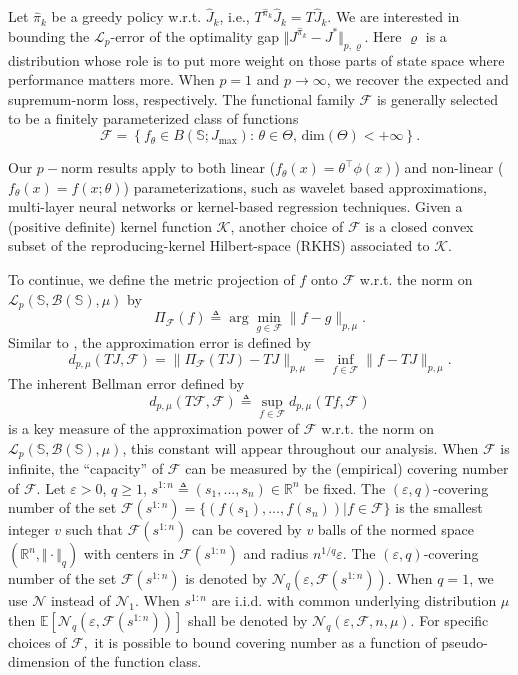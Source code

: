 \documentclass[12pt,technote,onecolumn]{IEEEtran}
\begin{document}
Let $\widehat{\pi}_{k}$ be a greedy policy w.r.t. $\widehat{J}_{k}$,
i.e., $T^{\widehat{\pi}_{k}}\widehat{J}_{k}=T\widehat{J}_{k}$.
We are interested in bounding the $\mathcal{L}_{p}$-error of the
optimality gap $\Vert J^{\widehat{\pi}_{k}}-J^{*}\Vert _{p,\varrho}$.
Here $\varrho$ is a distribution whose role is to put more weight
on those parts of state space where performance matters more. When
$p=1$ and $p\rightarrow\infty$, we recover the expected and supremum-norm
loss, respectively. The functional family $\mathcal{F}$ is generally selected to be a finitely parameterized class of functions
$$\mathcal{F}=\left\{f_\theta\in B(\mathbb{S};J_{\max}):\, \theta\in\Theta,\,\text{dim}(\Theta)<+\infty\right\}.$$

Our $p-$norm results apply to both linear ($f_\theta(x)=\theta^\top\phi(x)$) and non-linear ($f_\theta(x)=f(x;\theta)$) parameterizations, such as wavelet based approximations, multi-layer neural networks or kernel-based regression techniques. Given a (positive definite) kernel function
$\mathcal{K}$, another choice of $\mathcal{F}$ is a closed convex subset of the reproducing-kernel Hilbert-space (RKHS) associated to $\mathcal{K}$. 

To continue, we define the metric projection of $f$ onto $\mathcal{F}$
w.r.t. the norm on $\mathcal{L}_{p}\left(\mathbb{S},\mathcal{B}\left(\mathbb{S}\right),\mu\right)$
by 
$$
\Pi_{\mathcal{F}}\left(f\right)\triangleq\arg\min_{g\in\mathcal{F}}\|f-g\|_{p,\mu}.
$$
Similar to \cite{munos2008finite}, the approximation error is defined
by
\[
d_{p,\mu}\left(TJ,\mathcal{F}\right)=\|\Pi_{\mathcal{F}}\left(TJ\right)-TJ\|_{p,\mu}=\inf_{f\in\mathcal{F}}\|f-TJ\|_{p,\mu}.
\]
The inherent Bellman error defined by
\[
d_{p,\mu}\left(T\mathcal{F},\mathcal{F}\right)\triangleq\sup_{f\in\mathcal{F}}d_{p,\mu}\left(Tf,\mathcal{F}\right)
\]
is a key measure of the approximation power of $\mathcal{F}$
w.r.t. the norm on $\mathcal{L}_{p}(\mathbb{S},\mathcal{B}(\mathbb{S}),\mu)$,
this constant will appear throughout our analysis. When $\mathcal{F}$
is infinite, the ``capacity'' of $\mathcal{F}$
can be measured by the (empirical) covering number of $\mathcal{F}.$
Let $\varepsilon>0$, $q\geq1$, $s^{1:n}\triangleq(s_{1},\dots,s_{n})\in\mathbb{R}^{n}$
be fixed. The $\left(\varepsilon,q\right)$-covering number of the
set $\mathcal{F}(s^{1:n})=\{ (f(s_{1}),\dots,f(s_{n}))\vert f\in\mathcal{F}\} $
is the smallest integer $v$ such that $\mathcal{F}(s^{1:n})$
can be covered by $v$ balls of the normed space $(\mathbb{R}^{n},\Vert \cdot\Vert _{q})$
with centers in $\mathcal{F}(s^{1:n})$ and radius $n^{1/q}\varepsilon$.
The $\left(\varepsilon,q\right)$-covering number of the set $\mathcal{F}(s^{1:n})$
is denoted by $\mathcal{N}_{q}(\varepsilon,\mathcal{F}(s^{1:n}))$.
When $q=1$, we use $\mathcal{N}$ instead of $\mathcal{N}_{1}$.
When $s^{1:n}$ are i.i.d. with common underlying distribution $\mu$
then $\mathbb{E}[\mathcal{N}_{q}(\varepsilon,\mathcal{F}(s^{1:n}))]$
shall be denoted by $\mathcal{N}_{q}(\varepsilon,\mathcal{F},n,\mu).$ For specific choices of $\mathcal{F},$ it
is possible to bound covering number as a function of pseudo-dimension
of the function class. 
\end{document}
